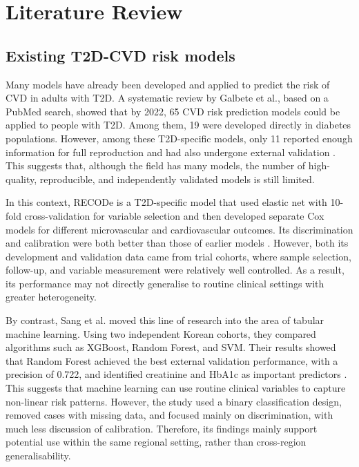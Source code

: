 \documentclass[conference]{IEEEtran}
\begin{document}


\section{Literature Review}

\subsection{Existing T2D-CVD risk models}

Many models have already been developed and applied to predict the risk of CVD in adults with T2D. A systematic review by Galbete et al., based on a PubMed search, showed that by 2022, 65 CVD risk prediction models could be applied to people with T2D. Among them, 19 were developed directly in diabetes populations. However, among these T2D-specific models, only 11 reported enough information for full reproduction and had also undergone external validation \cite{galbete2022cardiovascular}. This suggests that, although the field has many models, the number of high-quality, reproducible, and independently validated models is still limited.

In this context, RECODe is a T2D-specific model that used elastic net with 10-fold cross-validation for variable selection and then developed separate Cox models for different microvascular and cardiovascular outcomes. Its discrimination and calibration were both better than those of earlier models \cite{basu2017development}. However, both its development and validation data came from trial cohorts, where sample selection, follow-up, and variable measurement were relatively well controlled. As a result, its performance may not directly generalise to routine clinical settings with greater heterogeneity.

By contrast, Sang et al. moved this line of research into the area of tabular machine learning. Using two independent Korean cohorts, they compared algorithms such as XGBoost, Random Forest, and SVM. Their results showed that Random Forest achieved the best external validation performance, with a precision of 0.722, and identified creatinine and HbA1c as important predictors \cite{sang2024prediction}. This suggests that machine learning can use routine clinical variables to capture non-linear risk patterns. However, the study used a binary classification design, removed cases with missing data, and focused mainly on discrimination, with much less discussion of calibration. Therefore, its findings mainly support potential use within the same regional setting, rather than cross-region generalisability.
\end{document}
